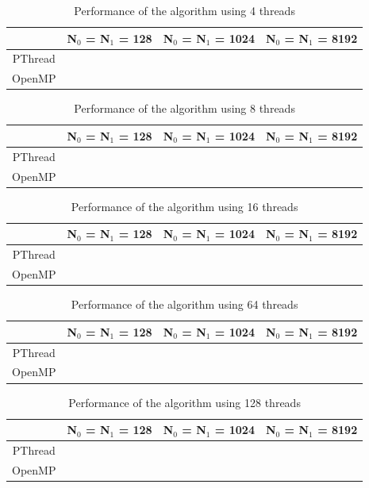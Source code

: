 \documentclass[10pt,twocolumn]{witseiepaper}
\begin{document}
\begin{table}[h]
\centering
\caption{Performance of the algorithm using 4 threads}
\begin{tabular}{|c|c|c|c|}
	\hline 
	 & N$_{0}$ = N$_{1}$ = 128 &  N$_{0}$ = N$_{1}$ = 1024 & N$_{0}$ = N$_{1}$ = 8192 \\ 
	\hline 
	PThread &  &  &  \\ 
	\hline 
	OpenMP &  &  &  \\ 
	\hline 
\end{tabular}
\end{table} 

\begin{table}[h]
		\centering
\caption{Performance of the algorithm using 8 threads}
\begin{tabular}{|c|c|c|c|}
	\hline 
	 & N$_{0}$ = N$_{1}$ = 128 &  N$_{0}$ = N$_{1}$ = 1024 & N$_{0}$ = N$_{1}$ = 8192 \\ 
	\hline 
	PThread &  &  &  \\ 
	\hline 
	OpenMP &  &  &  \\ 
	\hline 
\end{tabular} 
\end{table}

\begin{table}[h]
		\centering
	\caption{Performance of the algorithm using 16 threads}
\begin{tabular}{|c|c|c|c|}
	\hline 
	 & N$_{0}$ = N$_{1}$ = 128 &  N$_{0}$ = N$_{1}$ = 1024 & N$_{0}$ = N$_{1}$ = 8192 \\ 
	\hline 
	PThread &  &  &  \\ 
	\hline 
	OpenMP &  &  &  \\ 
	\hline 
\end{tabular} 
\end{table}

\begin{table}[h]
		\centering
	\caption{Performance of the algorithm using 64 threads}
\begin{tabular}{|c|c|c|c|}
	\hline 
	 & N$_{0}$ = N$_{1}$ = 128 &  N$_{0}$ = N$_{1}$ = 1024 & N$_{0}$ = N$_{1}$ = 8192 \\ 
	\hline 
	PThread &  &  &  \\ 
	\hline 
	OpenMP &  &  &  \\ 
	\hline 
\end{tabular} 
\end{table}

\begin{table}[h]
	\centering
	\caption{Performance of the algorithm using 128 threads}
	\begin{tabular}{|c|c|c|c|}
		\hline 
		& N$_{0}$ = N$_{1}$ = 128 &  N$_{0}$ = N$_{1}$ = 1024 & N$_{0}$ = N$_{1}$ = 8192 \\ 
		\hline 
		PThread &  &  &  \\ 
		\hline 
		OpenMP &  &  &  \\ 
		\hline 
	\end{tabular} 
\end{table}
\end{document}
